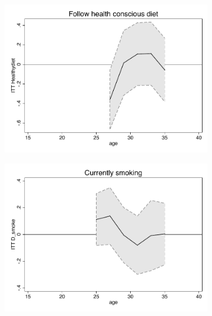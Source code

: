 \documentclass[a4paper ]{article}
\begin{document}
\newpage
\begin{figure}[p]
\begin{subfigure}[h]{0.48\textwidth}\centering
	\includegraphics[width=\textwidth]{../../analysis/graphs/SOEP/Healthydiet_LC.pdf}
\end{subfigure}
\quad
\begin{subfigure}[h]{0.48\textwidth}\centering
	\includegraphics[width=\textwidth]{../../analysis/graphs/SOEP/D_smoke_LC.pdf}
\end{subfigure}


\end{figure}
\end{document}
